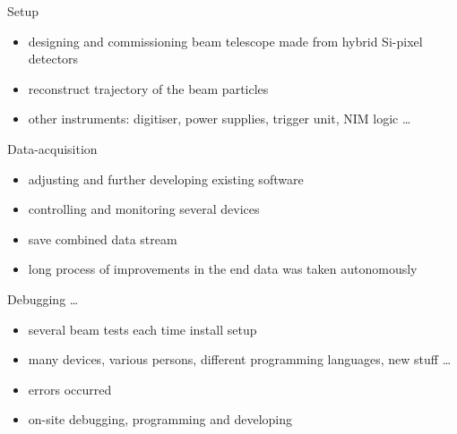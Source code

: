 \begin{frame}{Setup}
%
  \begin{itemize}\itemfill
    \item designing and commissioning beam telescope made from hybrid Si-pixel detectors
    \item reconstruct trajectory of the beam particles
    \item other instruments: digitiser, power supplies, trigger unit, NIM logic \ldots
  \end{itemize}
%
%
\end{frame}
\begin{frame}{Data-acquisition}
%
%
  \begin{itemize}\itemfill
    \item adjusting and further developing existing software
    \item controlling and monitoring several devices
    \item save combined data stream
    \item long process of improvements \ra in the end data was taken autonomously
  \end{itemize}
%
\end{frame}
\begin{frame}{Debugging \ldots}
%
%
  \begin{itemize}\itemfill
    \item several beam tests \ra each time install setup
    \item many devices, various persons, different programming languages, new stuff \ldots
    \item errors occurred
    \item on-site debugging, programming and developing
  \end{itemize}
%
\end{frame}
